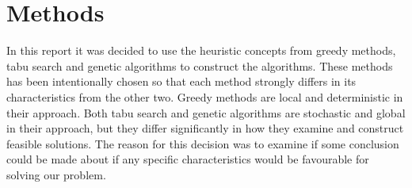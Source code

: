 \chapter{Methods}
In this report it was decided to use the heuristic concepts from greedy methods, tabu search and genetic algorithms to construct the algorithms. These methods has been intentionally chosen so that each method strongly differs in its characteristics from the other two. Greedy methods are local and deterministic in their approach. Both tabu search and genetic algorithms are stochastic and global in their approach, but they differ significantly in how they examine and construct feasible solutions. The reason for this decision was to examine if some conclusion could be made about if any specific characteristics would be favourable for solving our problem. 







